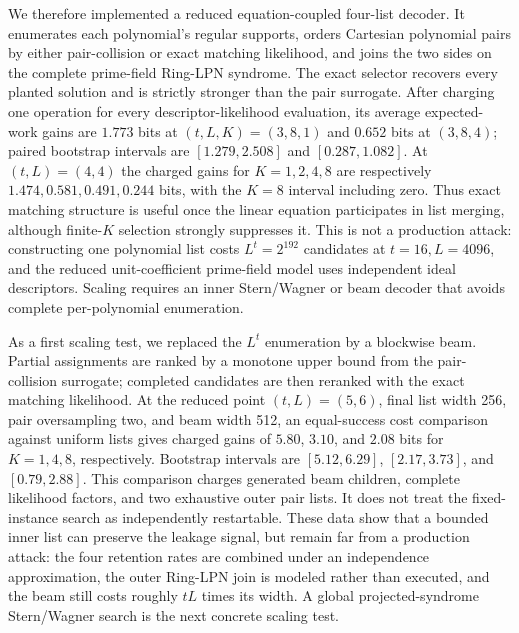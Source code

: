 We therefore implemented a reduced equation-coupled four-list decoder.  It
enumerates each polynomial's regular supports, orders Cartesian polynomial
pairs by either pair-collision or exact matching likelihood, and joins the two
sides on the complete prime-field Ring-LPN syndrome.  The exact selector
recovers every planted solution and is strictly stronger than the pair
surrogate.  After charging one operation for every descriptor-likelihood
evaluation, its average expected-work gains are $1.773$ bits at
$(t,L,K)=(3,8,1)$ and $0.652$ bits at $(3,8,4)$; paired bootstrap intervals are
$[1.279,2.508]$ and $[0.287,1.082]$.  At $(t,L)=(4,4)$ the charged gains for
$K=1,2,4,8$ are respectively $1.474,0.581,0.491,0.244$ bits, with the $K=8$
interval including zero.  Thus exact matching structure is useful once the
linear equation participates in list merging, although finite-$K$ selection
strongly suppresses it.  This is not a production attack: constructing one
polynomial list costs $L^t=2^{192}$ candidates at $t=16,L=4096$, and the
reduced unit-coefficient prime-field model uses independent ideal descriptors.
Scaling requires an inner Stern/Wagner or beam decoder that avoids complete
per-polynomial enumeration.

As a first scaling test, we replaced the $L^t$ enumeration by a blockwise
beam.  Partial assignments are ranked by a monotone upper bound from the
pair-collision surrogate; completed candidates are then reranked with the
exact matching likelihood.  At the reduced point $(t,L)=(5,6)$, final list
width 256, pair oversampling two, and beam width 512, an equal-success cost
comparison against uniform lists gives charged gains of $5.80$, $3.10$, and
$2.08$ bits for $K=1,4,8$, respectively.  Bootstrap intervals are
$[5.12,6.29]$, $[2.17,3.73]$, and $[0.79,2.88]$.  This comparison charges
generated beam children, complete likelihood factors, and two exhaustive
outer pair lists.  It does not treat the fixed-instance search as independently
restartable.  These data show that a bounded inner list can preserve the
leakage signal, but remain far from a production attack: the four retention
rates are combined under an independence approximation, the outer Ring-LPN
join is modeled rather than executed, and the beam still costs roughly
$tL$ times its width.  A global projected-syndrome Stern/Wagner search is the
next concrete scaling test.


